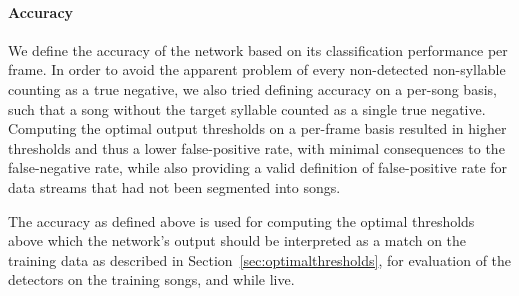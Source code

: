 \documentclass[10pt,letterpaper]{article}
\newcommand\sref[1]{Section~\ref{#1}}
\let\oldmarginpar\marginpar
\renewcommand{\marginpar}[1]{\oldmarginpar{\linespread{1}\scriptsize{#1}}}
\renewcommand{\subsubsection}[1]{\paragraph{#1}}
\begin{document}
\subsubsection{Accuracy}
\label{sec:accuracy}

We define the accuracy of the network based on its classification performance per frame. In order to avoid the apparent problem of every non-detected non-syllable counting as a true negative, we also tried defining accuracy on a per-song basis, such that a song without the target syllable counted as a single true negative.  Computing the optimal output thresholds on a per-frame basis resulted in higher thresholds and thus a lower false-positive rate, with minimal consequences to the false-negative rate, while also providing a valid definition of false-positive rate for data streams that had not been segmented into songs.




The accuracy as defined above is used for computing the optimal thresholds above
which the network's output should be interpreted as a match on the
training data as described in \sref{sec:optimalthresholds}, for
evaluation of the detectors on the training songs,
and while live.
\end{document}
